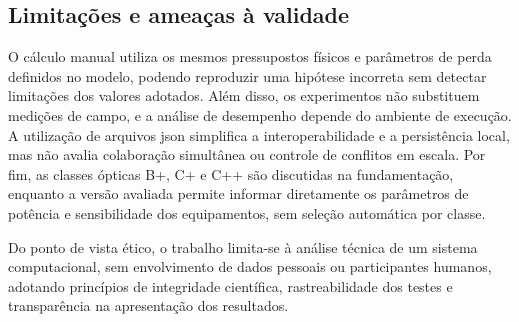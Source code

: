 \subsection{Limitações e ameaças à validade}

O cálculo manual utiliza os mesmos pressupostos físicos e parâmetros de perda definidos no modelo, podendo reproduzir uma hipótese incorreta sem detectar limitações dos valores adotados. Além disso, os experimentos não substituem medições de campo, e a análise de desempenho depende do ambiente de execução. A utilização de arquivos \gls{json} simplifica a interoperabilidade e a persistência local, mas não avalia colaboração simultânea ou controle de conflitos em escala. Por fim, as classes ópticas B+, C+ e C++ são discutidas na fundamentação, enquanto a versão avaliada permite informar diretamente os parâmetros de potência e sensibilidade dos equipamentos, sem seleção automática por classe.

Do ponto de vista ético, o trabalho limita-se à análise técnica de um sistema computacional, sem envolvimento de dados pessoais ou participantes humanos, adotando princípios de integridade científica, rastreabilidade dos testes e transparência na apresentação dos resultados.
